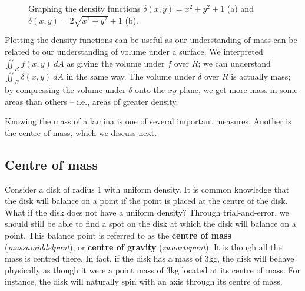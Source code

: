 \begin{figure}
\centering
\qquad
{}
\caption{Graphing the density functions  $\delta(x,y) = x^2+y^2+1$ (a) and $\delta(x,y) = 2\sqrt{x^2+y^2}+1$ (b).}
\label{fig_double_17}
\end{figure}

Plotting the density functions can be useful as our understanding of mass can be related to our understanding of volume under a surface. We interpreted $\iint_R f(x,y)\ dA$ as giving the volume under $f$ over $R$; we can understand $\iint_R\delta(x,y)\ dA$ in the same way. The volume under $\delta$ over $R$ is actually mass; by compressing the volume under $\delta$ onto the $xy$-plane, we get more mass in some areas than others -- i.e., areas of greater density.

Knowing the mass of a lamina is one of several important measures. Another is the centre of mass, which we discuss next.

\subsection{Centre of mass}

Consider a disk of radius 1 with uniform density. It is common knowledge that the disk will balance on a point if the point is placed at the centre of the disk. What if the disk does not have a uniform density? Through trial-and-error, we should still be able to find a spot on the disk at which the disk will balance on a point. This balance point is referred to as the \textbf{centre of mass} (\textit{massamiddelpunt}), or \textbf{centre of gravity} (\textit{zwaartepunt}). It is though all the mass is centred there. In fact, if the disk has a mass of 3kg, the disk will behave physically as though it were a point mass of 3kg located at its centre of mass. For instance, the disk will naturally spin with an axis through its centre of mass.

